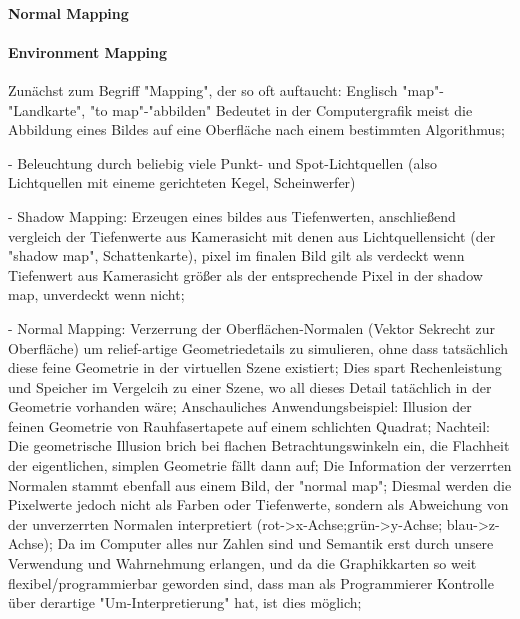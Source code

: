 	\paragraph{Normal Mapping}
	\label{par:normalMapping}
	
		
	\paragraph{Environment Mapping}



Zunächst zum Begriff "Mapping", der so oft auftaucht: Englisch "map"-"Landkarte", "to map"-"abbilden" Bedeutet in der Computergrafik meist die Abbildung eines Bildes auf eine Oberfläche nach einem bestimmten Algorithmus;

- Beleuchtung durch beliebig viele Punkt- und Spot-Lichtquellen (also Lichtquellen mit eineme gerichteten Kegel, Scheinwerfer)

- Shadow Mapping: Erzeugen eines bildes aus Tiefenwerten, anschließend vergleich der Tiefenwerte aus Kamerasicht mit denen aus Lichtquellensicht (der "shadow map", Schattenkarte), pixel im finalen Bild gilt als verdeckt wenn Tiefenwert aus Kamerasicht größer als der entsprechende Pixel in der shadow map, unverdeckt wenn nicht;

- Normal Mapping: Verzerrung der Oberflächen-Normalen (Vektor Sekrecht zur Oberfläche) um relief-artige Geometriedetails zu simulieren, ohne dass tatsächlich diese feine Geometrie in der virtuellen Szene existiert; Dies spart Rechenleistung und Speicher im Vergelcih zu einer Szene, wo all dieses Detail tatächlich in der Geometrie vorhanden wäre; Anschauliches Anwendungsbeispiel: Illusion der feinen Geometrie von Rauhfasertapete auf einem schlichten Quadrat; Nachteil: Die geometrische Illusion brich bei flachen Betrachtungswinkeln ein, die Flachheit der eigentlichen, simplen Geometrie fällt dann auf; Die Information der verzerrten Normalen stammt ebenfall aus einem Bild, der "normal map"; Diesmal werden die Pixelwerte jedoch nicht als Farben oder Tiefenwerte, sondern als Abweichung von der unverzerrten Normalen interpretiert (rot->x-Achse;grün->y-Achse; blau->z-Achse); Da im Computer alles nur Zahlen sind und Semantik erst durch unsere Verwendung und Wahrnehmung erlangen, und da die Graphikkarten so weit flexibel/programmierbar geworden sind, dass man als Programmierer Kontrolle über derartige "Um-Interpretierung" hat, ist dies möglich;

